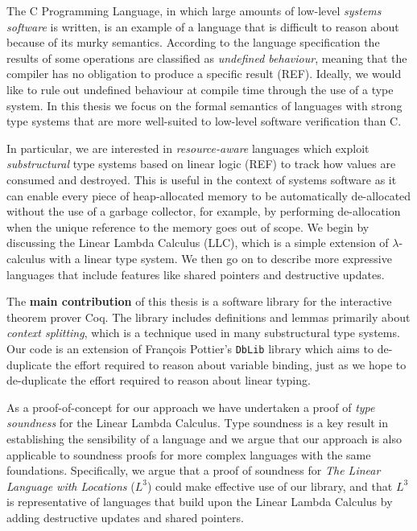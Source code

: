 \documentclass[]{unswthesis}
\newcommand{\Francois}{Fran\frenchc{c}ois }
\let\frenchc\c
\let\c\texttt
\let\i\textit
\let\b\textbf
\begin{document}
The C Programming Language, in which large amounts of low-level \i{systems software} is written, is an example of a language that is difficult to reason about because of its murky semantics. According to the language specification the results of some operations are classified as \i{undefined behaviour}, meaning that the compiler has no obligation to produce a specific result (REF). Ideally, we would like to rule out undefined behaviour at compile time through the use of a type system. In this thesis we focus on the formal semantics of languages with strong type systems that are more well-suited to low-level software verification than C.

In particular, we are interested in \i{resource-aware} languages which exploit \i{substructural} type systems based on linear logic (REF) to track how values are consumed and destroyed. This is useful in the context of systems software as it can enable every piece of heap-allocated memory to be automatically de-allocated without the use of a garbage collector, for example, by performing de-allocation when the unique reference to the memory goes out of scope. We begin by discussing the Linear Lambda Calculus (LLC), which is a simple extension of $\lambda$-calculus with a linear type system. We then go on to describe more expressive languages that include features like shared pointers and destructive updates.

The \b{main contribution} of this thesis is a software library for the interactive theorem prover Coq. The library includes definitions and lemmas primarily about \i{context splitting}, which is a technique used in many substructural type systems. Our code is an extension of \Francois Pottier's \c{DbLib} library which aims to de-duplicate the effort required to reason about variable binding, just as we hope to de-duplicate the effort required to reason about linear typing.

As a proof-of-concept for our approach we have undertaken a proof of \i{type soundness} for the Linear Lambda Calculus. Type soundness is a key result in establishing the sensibility of a language and we argue that our approach is also applicable to soundness proofs for more complex languages with the same foundations. Specifically, we argue that a proof of soundness for \i{The Linear Language with Locations} ($L^3$) could make effective use of our library, and that $L^3$ is representative of languages that build upon the Linear Lambda Calculus by adding destructive updates and shared pointers.
\end{document}

